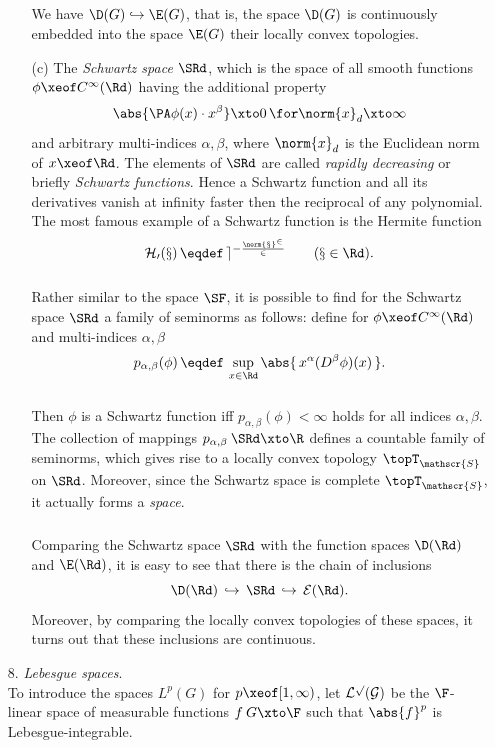\documentclass[11pt,twoside]{article}
\def\G{G}
\begin{document}
\begin{itemize}[leftmargin=12pt,itemsep=5pt]
\begin{itemize}[leftmargin=17pt]
\subparagraph{}
We have $\D(\G) \hookrightarrow \E(\G)$,
that is,
the space $\D(\G)$ is continuously embedded into the space $\E(\G)$
{\wrt} their locally convex topologies.

\item[(c)]
The \textit{Schwartz space} $\SRd$,
which is the space of all smooth functions $\phi \xeof C^{\infty}(\Rd)$
having the additional property
\[
\abs{ \PA \phi(x) \cdot x^{\beta}} \xto 0 \,
\for \norm{x}_d \xto \infty
\]
and arbitrary multi-indices $\alpha,\beta$,
where $\norm{x}_d$ is the Euclidean norm of $x \xeof \Rd$.
The elements of $\SRd$ are called \textit{rapidly decreasing}
or briefly \textit{Schwartz functions}.
Hence a Schwartz function and all its derivatives vanish at infinity
faster then the reciprocal of any polynomial.
The most famous example of a Schwartz function is the Hermite function
\[
\cal{H}_0(x) \, \eqdef \, e^{- \frac{\norm{x}^2}{2}} \quad \quad (x \in \Rd).
\]

\subparagraph{}
Rather similar to the space $\SF$,
it is possible to find for the Schwartz space $\SRd$
a family of seminorms as follows:
define for $\phi \xeof C^{\infty}(\Rd)$ and multi-indices $\alpha, \beta$
\begin{equation}\label{I_SRN_FAMILY_OF_SEMINORMS}
p_{\alpha,\beta}(\phi) \, \eqdef \,
\sup_{x \in \Rd} \abs{ \, x^{\alpha} (D^{\beta} \phi) (x) \, } .
\end{equation}

\subparagraph{}
Then $\phi$ is a Schwartz function
iff $p_{\alpha,\beta}(\phi) < \infty$
holds for all indices $\alpha, \beta$.
The collection of mappings $p_{\alpha,\beta}\:\SRd \xto \R$
defines a countable family of seminorms,
which gives rise to a locally convex topology $\topT_{\mathscr{S}}$ on $\SRd$.
Moreover,
since the Schwartz space is complete {\wrt} $\topT_{\mathscr{S}}$,
it actually forms a \textit{{\FRECHET} space}.

\subparagraph{}
Comparing the Schwartz space $\SRd$ with the function spaces
$\D(\Rd)$ and $\E(\Rd)$,
it is easy to see that there is the chain of inclusions
\[
\D(\Rd) \, \hookrightarrow \, \SRd \, \hookrightarrow \, \cal{E}(\Rd).
\]
Moreover,
by comparing the locally convex topologies of these spaces,
it turns out that these inclusions are continuous.
\end{itemize}

\item[8.] \textit{Lebesgue spaces}.\\
To introduce the spaces $L^p(\G)$ for $p \xeof [1,\infty)$,
let $\cal{L}^p(\G)$ be the $\F$-linear space of measurable functions
$f\:\G \xto \F$
such that $\abs{f} ^p$ is Lebesgue-integrable.


\end{itemize}
\end{document}
